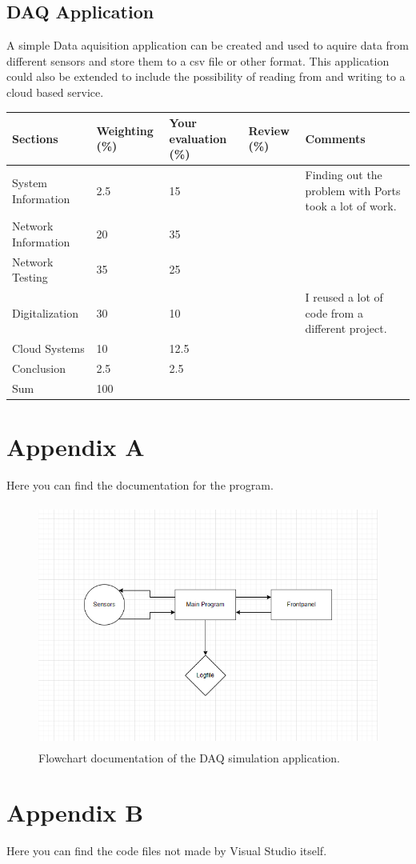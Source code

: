 \documentclass[11pt, A4paper, english]{article}
\begin{document}
		\subsection{DAQ Application}
A simple Data aquisition application can be created and used to aquire data from different sensors and store them to a csv file or other format. This application could also be extended to include the possibility of reading from and writing to a cloud based service.

\noindent \begin{tabularx}{\linewidth}{@{}X|X|X|X|X}
Sections 						& Weighting (\%)	& Your evaluation (\%) 	& Review (\%) 	& Comments \\
\hline
System Information 				& 2.5				& 15					&  				& Finding out the problem with Ports took a lot of work. \\
\hline
Network Information 			& 20				& 35 					&  				&  \\
\hline
Network Testing					& 35				& 25 					&  				&  \\
\hline
Digitalization	 				& 30				& 10					&  				& I reused a lot of code from a different project. \\
\hline
Cloud Systems 					& 10				& 12.5					&  				&  \\
\hline
Conclusion		 				& 2.5				& 2.5					&  				&  \\
\hline
Sum					 			& 100				&  						&  				& 
		\end{tabularx}

\printbibliography
	
	\section{Appendix A}
Here you can find the documentation for the program. \\
		\begin{figure}[H]
\includegraphics[width=12.6cm, height=8cm]{Flowchart.png}
\caption{Flowchart documentation of the DAQ simulation application.}
\label{im:flowchart}
		\end{figure}

	\section{Appendix B}
Here you can find the code files not made by Visual Studio itself.



\end{document}
